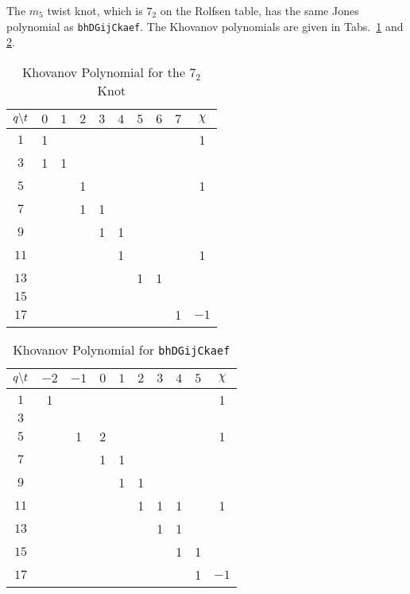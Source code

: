     The $m_{5}$ twist knot, which is $7_{2}$ on the Rolfsen table, has the
    same Jones polynomial as \texttt{bhDGijCkaef}. The Khovanov polynomials
    are given in Tabs.~\ref{table:m_5_kho} and \ref{table:bhDGijCkaef_kho}.
    \begin{table}
        \centering
        \begin{tabular}{| c | c | c | c | c | c | c | c | c | c |}
            \hline
            $q\symbol{92}t$&$0$&$1$&$2$&$3$&$4$&$5$&$6$&$7$&$\chi$\\
            \hline
            $1$&1&&&&&&&&1\\
            \hline
            $3$&1&1&&&&&&&\\
            \hline
            $5$&&&1&&&&&&1\\
            \hline
            $7$&&&1&1&&&&&\\
            \hline
            $9$&&&&1&1&&&&\\
            \hline
            $11$&&&&&1&&&&1\\
            \hline
            $13$&&&&&&1&1&&\\
            \hline
            $15$&&&&&&&&&\\
            \hline
            $17$&&&&&&&&1&$-1$\\
            \hline
        \end{tabular}
        \caption{Khovanov Polynomial for the $7_{2}$ Knot}
        \label{table:m_5_kho}
    \end{table}
    \begin{table}
        \centering
        \begin{tabular}{| c | c | c | c | c | c | c | c | c | c |}
            \hline
            $q\symbol{92}t$&$-2$&$-1$&$0$&$1$&$2$&$3$&$4$&$5$&$\chi$\\
            \hline
            $1$&1&&&&&&&&1\\
            \hline
            $3$&&&&&&&&&\\
            \hline
            $5$&&1&2&&&&&&1\\
            \hline
            $7$&&&1&1&&&&&\\
            \hline
            $9$&&&&1&1&&&&\\
            \hline
            $11$&&&&&1&1&1&&1\\
            \hline
            $13$&&&&&&1&1&&\\
            \hline
            $15$&&&&&&&1&1&\\
            \hline
            $17$&&&&&&&&1&$-1$\\
            \hline
        \end{tabular}
        \caption{Khovanov Polynomial for \texttt{bhDGijCkaef}}
        \label{table:bhDGijCkaef_kho}
    \end{table}
